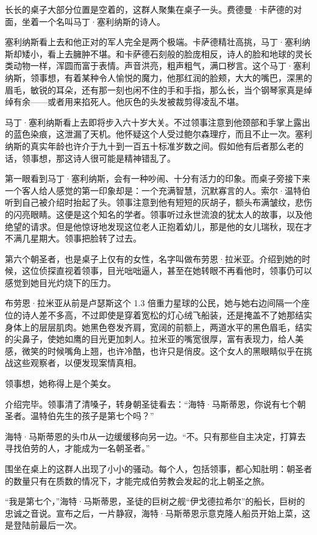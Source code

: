 \documentclass[AutoFakeBold=true]{book}
\begin{document}
长长的桌子大部分位置是空着的，这群人聚集在桌子一头。费德曼·卡萨德的对面，坐着一个名叫马丁·塞利纳斯的诗人。

塞利纳斯看上去和他正对的军人完全是两个极端。卡萨德精壮高挑，马丁·塞利纳斯却矮小，看上去臃肿不堪。和卡萨德石刻般的脸庞相反，诗人的脸和地球的灵长类动物一样，浑圆而富于表情。声音洪亮，粗声粗气，满口秽言。这个马丁·塞利纳斯，领事想，有着某种令人愉悦的魔力，他那红润的脸颊，大大的嘴巴，深黑的眉毛，敏锐的耳朵，还有那一刻也闲不住的手和手指，那么长，当个钢琴家真是绰绰有余——或者用来掐死人。他灰色的头发被裁剪得凌乱不堪。

马丁·塞利纳斯看上去即将步入六十岁大关。不过领事注意到他颈部和手掌上露出的蓝色染痕，这泄漏了天机。他怀疑这个人受过鲍尔森理疗，而且不止一次。塞利纳斯的真实年龄也许介于九十到一百五十标准岁数之间。假如他有后者那么老的话，领事想，那这诗人很可能是精神错乱了。

第一眼看到马丁·塞利纳斯，会有一种吵闹、十分有活力的印象。而桌子旁接下来一个客人给人感觉的第一印象却是：一个充满智慧，沉默寡言的人。索尔·温特伯听到自己被介绍时抬起了头。领事注意到他有短短的灰胡子，额头布满皱纹，悲伤的闪亮眼睛。这便是这个知名的学者。领事听过永世流浪的犹太人的故事，以及他绝望的请求。但是他惊讶地发现这位老人正抱着幼儿，那是他的女儿瑞秋，现在才不满几星期大。领事把脸转了过去。

第六个朝圣者，也是桌子上仅有的女性，名字叫做布劳恩·拉米亚。介绍到她的时候，这位侦探直视着领事，目光咄咄逼人，甚至在她转眼不再看他时，领事仍可以感觉到她目光灼烧下的压力。

布劳恩·拉米亚从前是卢瑟斯这个 1.3 倍重力星球的公民，她与她右边间隔一个座位的诗人差不多高，不过即使是穿着宽松的灯心绒飞船装，还是掩盖不了她那结实身体上的层层肌肉。她黑色卷发齐肩，宽阔的前额上，两道水平的黑色眉毛，结实的尖鼻子，使她如鹰的目光更加刺人。拉米亚的嘴宽很厚，富有表现力，给人美感，微笑的时候嘴角上翘，也许冷酷，也许只是俏皮。这个女人的黑眼睛似乎在挑战这些观察者，以便发现案情真相。

领事想，她称得上是个美女。

介绍完毕。领事清了清嗓子，转身朝圣徒看去：``海特·马斯蒂恩，你说有七个朝圣者。温特伯先生的孩子是第七个吗？''

海特·马斯蒂恩的头巾从一边缓缓移向另一边。``不。只有那些自主决定，打算去寻找伯劳的人，才能成为一名朝圣者。''

围坐在桌上的这群人出现了小小的骚动。每个人，包括领事，都心知肚明：朝圣者的数量只有在质数的情况下，才能完成伯劳教会发起的北上朝圣之旅。

``我是第七个，''海特·马斯蒂恩，圣徒的巨树之舰``伊戈德拉希尔''的船长，巨树的忠诚之音说。宣布之后，一片静寂，海特·马斯蒂恩示意克隆人船员开始上菜，这是登陆前最后一次。
\end{document}

